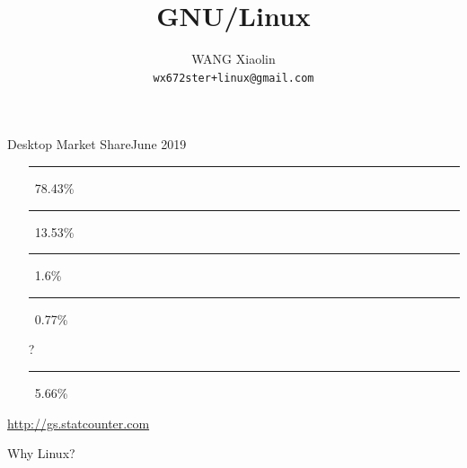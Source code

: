 \newcommand{\unix}{{\fontspec{Purisa}{UNIX}}}
\newcommand{\emacs}{\texttt{[image: emacs-icon]}}
\newcommand{\google}{\raisebox{-.2em}{\texttt{[image: google]}}}
\newcommand{\GG}{\textcolor{SkyBlue}{\nerd }}
\newcommand{\world}{\textcolor{blue}{\nerd }}
\newcommand{\iOS}{\textcolor{orange}{\nerd }}
\newcommand{\moodle}{\texttt{[image: moodle]}}

\title{GNU/Linux}
\author{WANG Xiaolin\\{\footnotesize \texttt{wx672ster+linux@gmail.com}}}



\frame{\titlepage}

\begin{frame}{Desktop Market Share}{June 2019}
  \begin{itemize}
  \item[\win] \textcolor{SkyBlue}{\rule{.7843\textwidth}{2mm}}\,
    78.43\%    
  \item[\apple] \textcolor{LightGray}{\rule{.1353\textwidth}{2mm}}\,
    13.53\%
  \item[\linux] \rule{.016\textwidth}{2mm}\, 1.6\%
  \item[\chrome] \textcolor{Orange}{\rule{.0077\textwidth}{2mm}}\,
    0.77\%
  \item[?] \textcolor{Green}{\rule{.0566\textwidth}{2mm}}\, 5.66\%
  \end{itemize}
  \begin{flushright}
    \tiny \url{http://gs.statcounter.com}
  \end{flushright}
  \begin{center}
    \Huge\purisa Why Linux?
  \end{center}
  


\end{frame}
